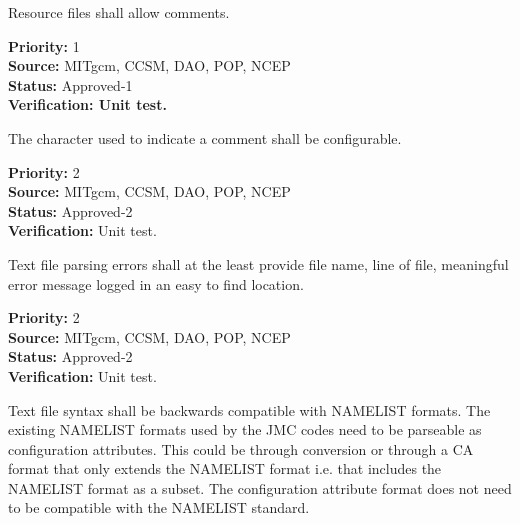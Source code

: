 




Resource files shall allow comments.

\begin{reqlist}
{\bf Priority:} 1 \\
{\bf Source:} MITgcm, CCSM, DAO, POP, NCEP \\
{\bf Status:}  Approved-1\\
{\bf Verification: Unit test.}  
\end{reqlist}


The character used to indicate a comment shall be configurable.

\begin{reqlist}
{\bf Priority:} 2 \\
{\bf Source:} MITgcm, CCSM, DAO, POP, NCEP \\
{\bf Status:}  Approved-2\\
{\bf Verification:}  Unit test.
\end{reqlist}


Text file parsing errors shall at the least provide
file name, line of file, meaningful error message logged in an easy
to find location.

\begin{reqlist}
{\bf Priority:} 2 \\
{\bf Source:} MITgcm, CCSM, DAO, POP, NCEP \\
{\bf Status:} Approved-2 \\
{\bf Verification:} Unit test.
\end{reqlist}


Text file syntax shall be backwards compatible with NAMELIST formats.
The existing NAMELIST formats used by the JMC codes need to be parseable
as configuration attributes. This could be through conversion or through
a CA format that only extends the NAMELIST format i.e. that includes the
NAMELIST format as a subset.  The configuration attribute format does 
not need to be compatible with the NAMELIST standard.

